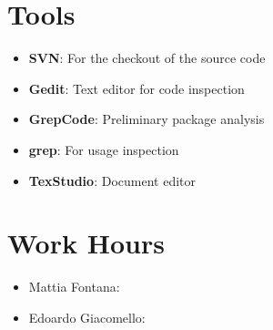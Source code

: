 \documentclass[11pt, a4paper,titlepage]{article}
\begin{document}
\section{Tools}
	\begin{itemize}
		\item \textbf{SVN}: For the checkout of the source code
		\item \textbf{Gedit}: Text editor for code inspection
		\item \textbf{GrepCode}: Preliminary package analysis
		\item \textbf{grep}: For usage inspection
		\item \textbf{TexStudio}: Document editor
		
	\end{itemize}
\section{Work Hours}
	\begin{itemize}
		\item Mattia Fontana:
		\item Edoardo Giacomello: 
	\end{itemize}
\end{document}
